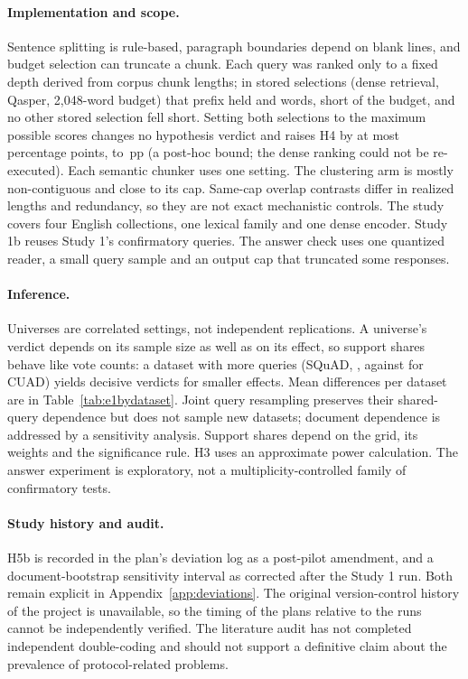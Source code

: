 \documentclass[11pt]{article}
\newcommand{\pp}{\ensuremath{\,\mathrm{pp}}}
\begin{document}
\paragraph{Implementation and scope.}
Sentence splitting is rule-based, paragraph boundaries depend on blank lines, and budget selection can truncate a chunk. Each query was ranked only to a fixed depth derived from corpus chunk lengths; in \UnderfillCells{} stored selections (dense retrieval, Qasper, 2,048-word budget) that prefix held \UnderfillWordsA{} and \UnderfillWordsB{} words, short of the budget, and no other stored selection fell short. Setting both selections to the maximum possible scores changes no hypothesis verdict and raises H4 by at most \UnderfillHFourDelta{} percentage points, to \UnderfillHFourMax\pp{} (a post-hoc bound; the dense ranking could not be re-executed). Each semantic chunker uses one setting. The clustering arm is mostly non-contiguous and close to its cap. Same-cap overlap contrasts differ in realized lengths and redundancy, so they are not exact mechanistic controls. The study covers four English collections, one lexical family and one dense encoder. Study 1b reuses Study 1's confirmatory queries. The answer check uses one quantized reader, a small query sample and an output cap that truncated some responses.

\paragraph{Inference.}
Universes are correlated settings, not independent replications. A universe's verdict depends on its sample size as well as on its effect, so support shares behave like vote counts: a dataset with more queries (SQuAD, \EoneNqSquadtwo{}, against \EoneNqCuad{} for CUAD) yields decisive verdicts for smaller effects. Mean differences per dataset are in Table~\ref{tab:e1bydataset}. Joint query resampling preserves their shared-query dependence but does not sample new datasets; document dependence is addressed by a sensitivity analysis. Support shares depend on the grid, its weights and the significance rule. H3 uses an approximate power calculation. The answer experiment is exploratory, not a multiplicity-controlled family of confirmatory tests.

\paragraph{Study history and audit.}
H5b is recorded in the plan's deviation log as a post-pilot amendment, and a document-bootstrap sensitivity interval as corrected after the Study 1 run. Both remain explicit in Appendix~\ref{app:deviations}. The original version-control history of the project is unavailable, so the timing of the plans relative to the runs cannot be independently verified. The literature audit has not completed independent double-coding and should not support a definitive claim about the prevalence of protocol-related problems.
\end{document}
